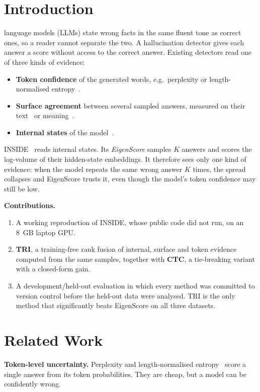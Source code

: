 \documentclass[journal]{IEEEtran}
\begin{document}
\section{Introduction}
 language models (LLMs) state wrong facts in the same fluent tone as correct ones, so a reader cannot separate the two. A hallucination detector gives each answer a score without access to the correct answer. Existing detectors read one of three kinds of evidence:
\begin{itemize}
\item \textbf{Token confidence} of the generated words, e.g.\ perplexity or length-normalised entropy~\cite{malinin2021}.
\item \textbf{Surface agreement} between several sampled answers, measured on their text~\cite{manakul2023} or meaning~\cite{farquhar2024}.
\item \textbf{Internal states} of the model~\cite{chen2024inside,sriramanan2024}.
\end{itemize}

INSIDE~\cite{chen2024inside} reads internal states. Its \emph{EigenScore} samples $K$ answers and scores the log-volume of their hidden-state embeddings. It therefore sees only one kind of evidence: when the model repeats the same wrong answer $K$ times, the spread collapses and EigenScore trusts it, even though the model's token confidence may still be low.

\textbf{Contributions.}
\begin{enumerate}
\item A working reproduction of INSIDE, whose public code did not run, on an 8~GB laptop GPU.
\item \textbf{TRI}, a training-free rank fusion of internal, surface and token evidence computed from the same samples, together with \textbf{CTC}, a tie-breaking variant with a closed-form gain.
\item A development/held-out evaluation in which every method was committed to version control before the held-out data were analysed. TRI is the only method that significantly beats EigenScore on all three datasets.
\end{enumerate}

\section{Related Work}
\textbf{Token-level uncertainty.} Perplexity and length-normalised entropy~\cite{malinin2021} score a single answer from its token probabilities. They are cheap, but a model can be confidently wrong.
\end{document}
